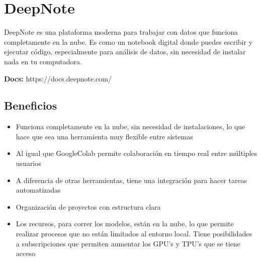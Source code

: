 \documentclass[a4paper,12pt]{article}
\begin{document}
\section{DeepNote}
DeepNote es una plataforma moderna para trabajar con datos que funciona
completamente en la nube. Es como un notebook digital donde puedes escribir y
ejecutar código, especialmente para análisis de datos, sin necesidad de instalar
nada en tu computadora.\cite{deepnote_docs}

\textbf{Docs:} https://docs.deepnote.com/\cite{deepnote_docs}
\subsection{Beneficios}\cite{deepnote_features}
\begin{itemize}
    \item Funciona completamente en la nube, sin necesidad de instalaciones, lo
        que hace que sea una herramienta muy flexible entre sistemas
    \item Al igual que GoogleColab permite colaboración en tiempo real entre
        múltiples usuarios
    \item A diferencia de otras herramientas, tiene una integración para hacer
        tareas automatizadas
    \item Organización de proyectos con estructura clara
    \item Los recursos, para correr los modelos, están en la nube, lo que permite
        realizar procesos que no están limitados al entorno local. Tiene
        posibilidades a subscripciones que permiten aumentar los GPU's y TPU's
        que se tiene acceso
\end{itemize}
\end{document}
